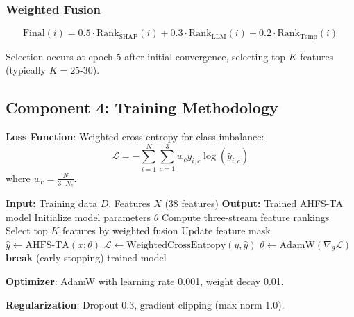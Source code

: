 \documentclass[journal]{IEEEtran}
\begin{document}
\subsubsection{Weighted Fusion}
\begin{equation}
\text{Final}(i) = 0.5 \cdot \text{Rank}_\text{SHAP}(i) + 0.3 \cdot \text{Rank}_\text{LLM}(i) + 0.2 \cdot \text{Rank}_\text{Temp}(i)
\end{equation}

Selection occurs at epoch 5 after initial convergence, selecting top $K$ features (typically $K=25$-30).

\subsection{Component 4: Training Methodology}

\textbf{Loss Function}: Weighted cross-entropy for class imbalance:
\begin{equation}
\mathcal{L} = -\sum_{i=1}^{N} \sum_{c=1}^{3} w_c y_{i,c} \log(\hat{y}_{i,c})
\end{equation}
where $w_c = \frac{N}{3 \cdot N_c}$.

\begin{algorithm}[h]
\caption{AHFS-TA Training Procedure}
\begin{algorithmic}[1]
\STATE \textbf{Input:} Training data $D$, Features $X$ (38 features)
\STATE \textbf{Output:} Trained AHFS-TA model
\STATE Initialize model parameters $\theta$
        \STATE Compute three-stream feature rankings
        \STATE Select top $K$ features by weighted fusion
        \STATE Update feature mask
    \ENDIF
        \STATE $\hat{y} \leftarrow \text{AHFS-TA}(x; \theta)$
        \STATE $\mathcal{L} \leftarrow \text{WeightedCrossEntropy}(y, \hat{y})$
        \STATE $\theta \leftarrow \text{AdamW}(\nabla_\theta \mathcal{L})$
    \ENDFOR
        \STATE \textbf{break} (early stopping)
    \ENDIF
\ENDFOR
\RETURN trained model
\end{algorithmic}
\end{algorithm}

\textbf{Optimizer}: AdamW with learning rate 0.001, weight decay 0.01.

\textbf{Regularization}: Dropout 0.3, gradient clipping (max norm 1.0).

\end{document}
